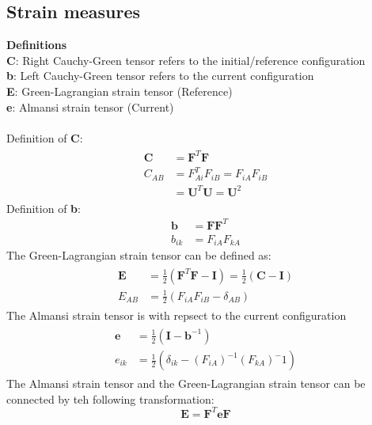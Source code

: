 \documentclass[12pt,3p]{article}
\numberwithin{equation}{section}
\begin{document}
\subsection{Strain measures}
\textbf{Definitions} \\
\textbf{C}: Right Cauchy-Green tensor refers to the initial/reference configuration \\
\textbf{b}: Left Cauchy-Green tensor refers to the current configuration \\
\textbf{E}: Green-Lagrangian strain tensor (Reference) \\
\textbf{e}: Almansi strain tensor (Current)\\ \\
Definition of \textbf{C}:
\begin{align}\label{315}
\begin{split}
\mathbf{C} &= \mathbf{F}^T \mathbf{F} \\
C_{AB} &= F_{Ai}^T F_{iB} = F_{iA} F_{iB}\\
				&= \mathbf{U}^T \mathbf{U} = \mathbf{U}^2 
\end{split}
\end{align}
Definition of \textbf{b}:
\begin{align*}
\mathbf{b} &= \mathbf{F} \mathbf{F}^T \\
b_{ik} &= F_{iA} F_{kA}
\end{align*}
The Green-Lagrangian strain tensor can be defined as:
\begin{align}\label{316}
\begin{split}
\mathbf{E} &= \frac{1}{2} (\mathbf{F}^T \mathbf{F} - \mathbf{I}) = \frac{1}{2} (\mathbf{C} - \mathbf{I}) \\
E_{AB} &= \frac{1}{2} (F_{iA} F_{iB} - \delta_{AB})
\end{split}
\end{align}
The Almansi strain tensor is with repsect to the current configuration 
\begin{align}\label{321}
\begin{split}
\mathbf{e} &= \frac{1}{2} (\mathbf{I} - \mathbf{b}^{-1}) \\
e_{ik} &= \frac{1}{2} (\delta_{ik} - (F_{iA})^{-1} (F_{kA})^-1)
\end{split}
\end{align}
The Almansi strain tensor and the Green-Lagrangian strain tensor can be connected by teh following transformation:
\begin{equation}\label{322}
\mathbf{E} = \mathbf{F}^T \mathbf{e} \mathbf{F}
\end{equation}
\end{document}
